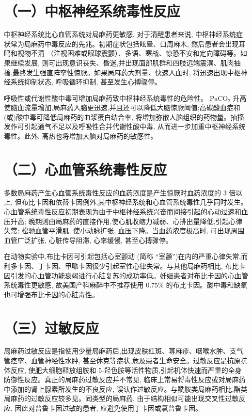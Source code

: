 \documentclass[10pt]{article}
\begin{document}
\section*{（一）中枢神经系统毒性反应}
中枢神经系统比心血管系统对局麻药更敏感, 对于清醒患者来说, 中枢神经系统症状常为局麻药中毒反应的先兆。初期症状包括眩晕、口周麻木, 然后患者会出现耳鸣和视物不清 （注视困难或眼球震颤）、多语、寒战、惊恐不安和定向障碍等。如果继续发展, 则可出现意识丧失、昏迷,并出现面部肌群和四肢远端震潩、肌肉抽搐,最终发生强直阵挛性惊厥。如果局麻药大剂量、快速人血时, 将迅速出现中枢神经系统抑制状态, 呼吸循环抑制, 甚至发生心搏骤停。

呼吸性或代谢性酸中毒可增加局麻药致中枢神经系统毒性的危险性。 $\mathrm{PaCO}_{2}$ 升高使脑血流量增加,局麻药人脑更迅速,并且还可以降低大脑惊厥阈值;高碳酸血症和(或)酸中毒可降低局麻药的血浆蛋白结合率, 将增加弥散人脑组织的药物量。抽搐发作可引起通气不足以及呼吸性合并代谢性酸中毒, 从而进一步加重中枢神经系统毒性。此外, 高热也将增加大脑对局麻药的敏感性。

\section*{（二）心血管系统毒性反应}
多数局麻药产生心血管系统毒性反应的血药浓度是产生惊厥时血药浓度的 3 倍以上, 但布比卡因和依替卡因例外,其中枢神经系统和心血管系统毒性几乎同时发生。心血管系统毒性反应初期表现为由于中枢神经系统兴奋而间接引起的心动过速和血压升高; 晚期则由局麻药的直接作用,使心肌收缩力减弱、心排出量降低,引起心律失常; 松驰血管平滑肌, 使小动脉扩张, 血压下降。当血药浓度极高时, 可出现周围血管广泛扩张, 心脏传导阻滞, 心率缓慢, 甚至心搏骤停。

在动物实验中,布比卡因可引起包括心室颤动 (简称 “室颤”)在内的严重心律失常,而利多卡因、丁卡因、甲哌卡因很少引起室性心律失常。与其他局麻药相比, 布比卡因引发的心血管功能衰竭进行心脏复苏的成功率低。妊娠患者对布比卡因的心血管系统毒性更敏感, 故美国产科麻醉中不推荐使用 $0.75 \%$ 的布比卡因。酸中毒和缺氧也可增强布比卡因的心脏毒性。

\section*{（三）过敏反应}
局麻药过敏反应是指使用少量局麻药后,出现皮肤红斑、荨麻疹、咽喉水肿、支气管痉挛、血管神经性水肿, 甚至休克等症状,危及患者生命安全。过敏反应是抗原抗体反应, 使肥大细胞释放组胺和 5-羟色胺等活性物质,引起机体快速而严重的全身防御性反应。真正的局麻药过敏反应并不常见, 临床上常易将毒性反应或对局麻药中添加的肾上腺素所发生的不良反应, 误认作过敏反应。与酰胺类局麻药相比,酯类局麻药的过敏反应较多见。同类型的局麻药, 由于结构相似可能出现交叉性过敏反应, 因此对普鲁卡因过敏的患者, 应避免使用丁卡因或氯普鲁卡因。
\end{document}

